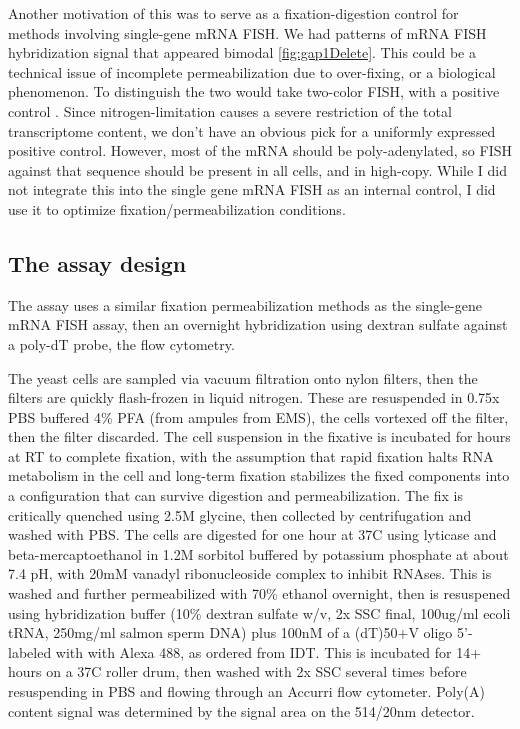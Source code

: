 Another motivation of this was to serve as a fixation-digestion
control for methods involving single-gene mRNA FISH.
We had patterns of mRNA FISH hybridization signal that appeared
bimodal \autoref{fig:gap1Delete}. 
This could be a technical issue of incomplete permeabilization due to
over-fixing, or a biological phenomenon.
To distinguish the two would take two-color FISH, with a positive
control \parencite{andersen2014genetic}.
Since nitrogen-limitation causes a severe restriction of the total
transcriptome content, we don't have an obvious pick for a uniformly
expressed positive control. 
However, most of the mRNA should be poly-adenylated, so FISH against
that sequence should be present in all cells, and in high-copy.
While I did not integrate this into the single gene mRNA FISH as an
internal control, I did use it to optimize fixation/permeabilization 
conditions.

%
%
%
\subsection{The assay design}
%
%
%

The assay uses a similar fixation permeabilization methods as the
single-gene mRNA FISH assay, then an overnight hybridization using
dextran sulfate against a poly-dT probe, the flow cytometry.

The yeast cells are sampled via vacuum filtration onto nylon
filters, then the filters are quickly flash-frozen in liquid nitrogen.
These are resuspended in 0.75x PBS buffered 4\% PFA (from ampules from
EMS), the cells vortexed off the filter, then the filter discarded.
The cell suspension in the fixative is incubated for hours at RT to
complete fixation, with the assumption that rapid fixation halts
RNA metabolism in the cell and long-term fixation stabilizes the fixed
components into a configuration that can survive digestion and 
permeabilization. The fix is critically quenched using 2.5M glycine,
then collected by centrifugation and washed with PBS. The cells are
digested for one hour at 37C using lyticase and beta-mercaptoethanol
in 1.2M sorbitol buffered
by potassium phosphate at about 7.4 pH, with 20mM vanadyl
ribonucleoside complex to inhibit RNAses. 
This is washed and further permeabilized with 70\% ethanol overnight,
then is resuspened using hybridization buffer
(10\% dextran sulfate w/v, 2x SSC final, 100ug/ml ecoli tRNA, 
250mg/ml salmon sperm DNA) plus 100nM of a (dT)50+V oligo 5'-labeled
with with Alexa 488, as ordered from IDT. 
This is incubated for 14+ hours on a 37C roller drum, then washed with
2x SSC several times before resuspending in PBS and flowing through an
Accurri flow cytometer.
Poly(A) content signal was determined by the signal area on the
514/20nm detector.

